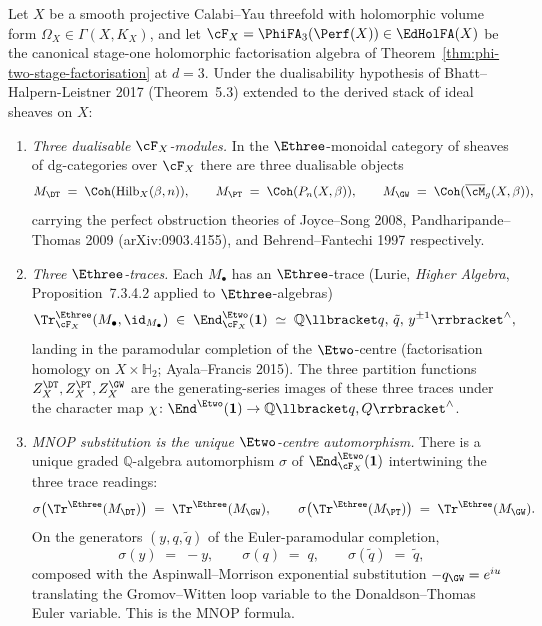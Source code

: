\begin{theorem}
\label{thm:mnop-e3-trace-intertwiner}
Let $X$ be a smooth projective Calabi--Yau threefold with holomorphic volume form
$\Omega_X\in\Gamma(X, K_X)$, and let
$\cF_X = \PhiFA_3(\Perf(X))\in\EdHolFA(X)$ be the canonical stage-one
holomorphic factorisation algebra of
Theorem~\ref{thm:phi-two-stage-factorisation} at $d = 3$. Under the
dualisability hypothesis of Bhatt--Halpern-Leistner 2017 (Theorem~5.3)
extended to the derived stack of ideal sheaves on $X$:
\begin{enumerate}[label=\textup{(\roman*)}]
\item \emph{Three dualisable $\cF_X$-modules.} In the $\Ethree$-monoidal
category of sheaves of dg-categories over $\cF_X$ there are three
dualisable objects
\[
 M_{\DT} \;=\; \Coh(\mathrm{Hilb}_X(\beta, n)), \qquad
 M_{\PT} \;=\; \Coh(P_n(X, \beta)), \qquad
 M_{\GW} \;=\; \Coh(\overline{\cM}_g(X, \beta)),
\]
carrying the perfect obstruction theories of Joyce--Song 2008,
Pandharipande--Thomas 2009 (arXiv:0903.4155), and Behrend--Fantechi
1997 respectively.
\item \emph{Three $\Ethree$-traces.} Each $M_\bullet$ has an $\Ethree$-trace
(Lurie, \emph{Higher Algebra}, Proposition~7.3.4.2 applied to
$\Ethree$-algebras)
\[
 \Tr^{\Ethree}_{\cF_X}(M_\bullet, \id_{M_\bullet}) \;\in\;
 \End^{\Etwo}_{\cF_X}(\mathbf{1})
 \;\simeq\;
 \mathbb{Q}\llbracket q,\, \tilde q,\, y^{\pm 1}\rrbracket^{\wedge},
\]
landing in the paramodular completion of the $\Etwo$-centre
(factorisation homology on $X\times \mathbb{H}_2$; Ayala--Francis 2015).
The three partition functions $Z^{\DT}_X, Z^{\PT}_X, Z^{\GW}_X$ are the
generating-series images of these three traces under the character map
$\chi\colon \End^{\Etwo}(\mathbf{1})\to \mathbb{Q}\llbracket q, Q\rrbracket^{\wedge}$.
\item \emph{MNOP substitution is the unique $\Etwo$-centre automorphism.}
There is a unique graded $\mathbb{Q}$-algebra automorphism $\sigma$ of
$\End^{\Etwo}_{\cF_X}(\mathbf{1})$ intertwining the three trace readings:
\[
 \sigma\bigl(\Tr^{\Ethree}(M_{\DT})\bigr)
 \;=\; \Tr^{\Ethree}(M_{\GW}),
 \qquad
 \sigma\bigl(\Tr^{\Ethree}(M_{\PT})\bigr)
 \;=\; \Tr^{\Ethree}(M_{\GW}).
\]
On the generators $(y, q, \tilde q)$ of the Euler-paramodular completion,
\[
 \sigma(y) \;=\; -y, \qquad \sigma(q) \;=\; q, \qquad \sigma(\tilde q) \;=\; \tilde q,
\]
composed with the Aspinwall--Morrison exponential substitution
$-q_{\GW} = e^{iu}$ translating the Gromov--Witten loop variable to the
Donaldson--Thomas Euler variable. This is the MNOP formula.
\end{enumerate}
\end{theorem}

